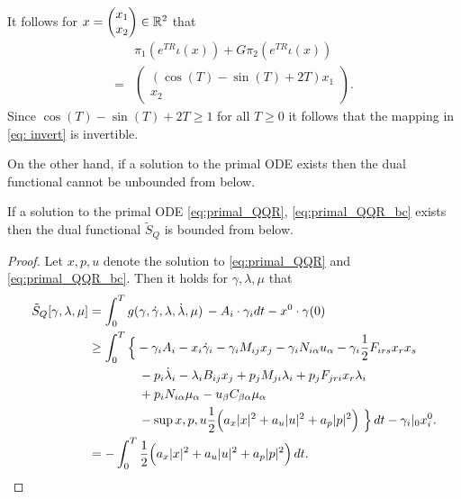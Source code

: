 \documentclass[11pt]{article}
\begin{document}
\begin{remark}
\begin{enumerate}
It follows for $x = \begin{pmatrix} x_1 \\ x_2 \end{pmatrix} \in \mathbb R^2$ that
\begin{align}
    &\pi_1 (e^{TR}  \iota(x)) + G \pi_2 (e^{TR} \iota(x)) \\
    =& \begin{pmatrix} (\cos(T) - \sin(T) + 2T) x_1 \\ x_2  \end{pmatrix}.
\end{align}
Since $\cos(T) - \sin(T) + 2T \geq 1$ for all $T \geq 0$ it follows that the mapping in \eqref{eq: invert} is invertible.

\end{enumerate}
\end{remark}


On the other hand, if a solution to the primal ODE exists then the dual functional cannot be unbounded from below.

\begin{proposition}
    If a solution to the primal ODE \eqref{eq:primal_QQR}, \eqref{eq:primal_QQR_bc} exists then the dual functional $\tilde{S}_Q$ is bounded from below.
\end{proposition}
\begin{proof}
    Let $x,p,u$ denote the solution to \eqref{eq:primal_QQR} and \eqref{eq:primal_QQR_bc}. Then it holds for $\gamma, \lambda, \mu$ that
    \begin{align*}
        \tilde{S}_Q[\gamma,\lambda,\mu] &= \int_0^T g(\gamma,\dot{\gamma}, \lambda, \dot{\lambda}, \mu) \, - A_i \cdot \gamma_i dt - x^0 \cdot \gamma(0) \\
        &\geq \int_0^T  \Big\{ - \gamma_i  A_i - x_i \dot{\gamma}_i - \gamma_i M_{ij} x_j - \gamma_i N_{i \alpha} u_\alpha - \gamma_i \frac{1}{2} F_{irs} x_r x_s \\
        & \qquad \qquad  - p_i \dot{\lambda}_i - \lambda_i B_{ij} x_j + p_j M_{ji} \lambda_i + p_j F_{jri} x_r \lambda_i\\
        & \qquad \qquad +  p_i N_{i \alpha} \mu_\alpha -  u_\beta C_{\beta \alpha} \mu_\alpha\\
        & \qquad \qquad - \sup{x,p,u} \frac{1}{2} \Big( a_x |x |^2 + a_u |u |^2 + a_p |p |^2 \Big) \ \Big\} \, dt - \gamma_i|_0 x^0_i. \\
        &= - \int_0^T \frac{1}{2} \Big( a_x  |x |^2 + a_u |u |^2 + a_p |p |^2 \Big) \, dt.
    \end{align*}
\end{proof}
\end{document}
